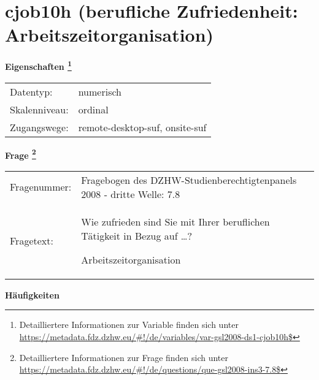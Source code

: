 
    \setcounter{footnote}{0}

    \vspace*{-1.8cm}
	\section{cjob10h (berufliche Zufriedenheit: Arbeitszeitorganisation)}
	\label{section:cjob10h}



    \vspace*{0.5cm}
    \noindent\textbf{Eigenschaften
	\footnote{Detailliertere Informationen zur Variable finden sich unter
		\url{https://metadata.fdz.dzhw.eu/\#!/de/variables/var-gsl2008-ds1-cjob10h$}}}\\
	\begin{tabularx}{\hsize}{@{}lX}
	Datentyp: & numerisch \\
	Skalenniveau: & ordinal \\
	Zugangswege: &
	  remote-desktop-suf, 
	  onsite-suf
 \\
    \end{tabularx}



				\vspace*{0.5cm}
                \noindent\textbf{Frage
	                \footnote{Detailliertere Informationen zur Frage finden sich unter
		              \url{https://metadata.fdz.dzhw.eu/\#!/de/questions/que-gsl2008-ins3-7.8$}}}\\
				\begin{tabularx}{\hsize}{@{}lX}
					Fragenummer: &
					  Fragebogen des DZHW-Studienberechtigtenpanels 2008 - dritte Welle:
					  7.8
 \\
					Fragetext: & Wie zufrieden sind Sie mit Ihrer beruflichen Tätigkeit in Bezug auf …?\par  Arbeitszeitorganisation \\
				\end{tabularx}





        		\vspace*{0.5cm}
                \noindent\textbf{Häufigkeiten}

